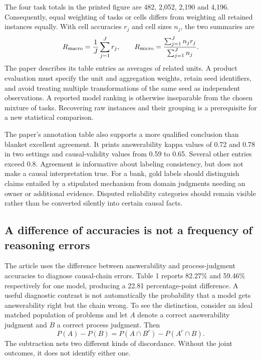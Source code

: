The four task totals in the printed figure are 482, 2,052, 2,190 and 4,196. Consequently, equal weighting of tasks or cells differs from weighting all retained instances equally. With cell accuracies $r_j$ and cell sizes $n_j$, the two summaries are
\begin{equation}
 R_{\rm macro}=\frac{1}{J}\sum_{j=1}^J r_j,
 \qquad
 R_{\rm micro}=\frac{\sum_{j=1}^J n_j r_j}{\sum_{j=1}^J n_j}.
 \label{exec21:check-weights}
\end{equation}
The paper describes its table entries as averages of related units. A product evaluation must specify the unit and aggregation weights, retain seed identifiers, and avoid treating multiple transformations of the same seed as independent observations. A reported model ranking is otherwise inseparable from the chosen mixture of tasks. Recovering raw instances and their grouping is a prerequisite for a new statistical comparison.\citep{exec21_causalitycheck,exec21_causalitycheck_reference}

The paper's annotation table also supports a more qualified conclusion than blanket excellent agreement. It prints answerability kappa values of 0.72 and 0.78 in two settings and causal-validity values from 0.59 to 0.65. Several other entries exceed 0.8. Agreement is informative about labeling consistency, but does not make a causal interpretation true. For a bank, gold labels should distinguish claims entailed by a stipulated mechanism from domain judgments needing an owner or additional evidence. Disputed reliability categories should remain visible rather than be converted silently into certain causal facts.\citep{exec21_causalitycheck}

\subsection{A difference of accuracies is not a frequency of reasoning errors}
\label{exec21:check-paired}
The article uses the difference between answerability and process-judgment accuracies to diagnose causal-chain errors. Table 1 reports 82.27\% and 59.46\% respectively for one model, producing a 22.81 percentage-point difference. A useful diagnostic contrast is not automatically the probability that a model gets answerability right but the chain wrong. To see the distinction, consider an ideal matched population of problems and let $A$ denote a correct answerability judgment and $B$ a correct process judgment. Then
\begin{equation}
 P(A)-P(B)=P(A\cap B^c)-P(A^c\cap B).
 \label{exec21:check-difference}
\end{equation}
The subtraction nets two different kinds of discordance. Without the joint outcomes, it does not identify either one.\citep{exec21_causalitycheck,exec21_causalitycheck_reference}

